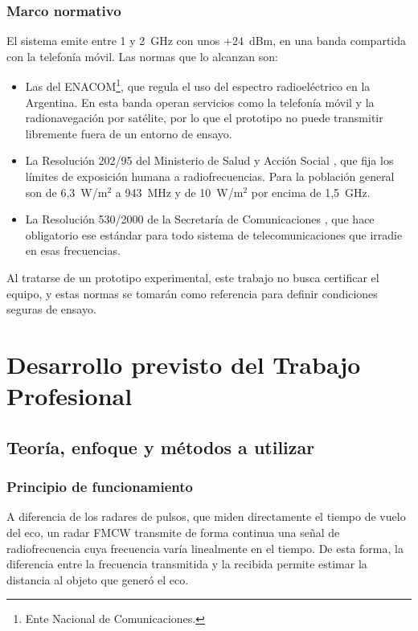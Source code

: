 \documentclass[11pt, a4paper, oneside]{article}
\newcommand{\sigla}[2]{#1\footnote{#2.}}
\begin{document}
\subsubsection{Marco normativo}

El sistema emite entre 1 y 2~GHz con unos $+24$~dBm, en una banda
compartida con la telefonía móvil. Las normas que lo alcanzan son:

\begin{itemize}
  \item Las del \sigla{ENACOM}{Ente Nacional de Comunicaciones}, que
        regula el uso del espectro radioeléctrico en la Argentina. En
        esta banda operan servicios como la telefonía móvil y la
        radionavegación por satélite, por lo que el prototipo no puede
        transmitir libremente fuera de un entorno de ensayo.
  \item La Resolución 202/95 del Ministerio de Salud y Acción Social \cite{Res202-95},
        que fija los límites de exposición humana a radiofrecuencias.
        Para la población general son de 6,3~W/m$^2$ a 943~MHz y de
        10~W/m$^2$ por encima de 1,5~GHz.
  \item La Resolución 530/2000 de la Secretaría de Comunicaciones
        \cite{Res530-00}, que hace obligatorio ese estándar para todo
        sistema de telecomunicaciones que irradie en esas frecuencias.
\end{itemize}

Al tratarse de un prototipo experimental, este trabajo no busca
certificar el equipo, y estas normas se tomarán como referencia para
definir condiciones seguras de ensayo.

\section{Desarrollo previsto del Trabajo Profesional}

\subsection{Teoría, enfoque y métodos a utilizar}

\subsubsection{Principio de funcionamiento}

A diferencia de los radares de pulsos, que miden directamente el
tiempo de vuelo del eco, un radar FMCW transmite de forma continua una
señal de radiofrecuencia cuya frecuencia varía linealmente en el
tiempo. De esta forma, la diferencia entre la frecuencia transmitida y
la recibida permite estimar la distancia al objeto que generó el eco.
\end{document}
